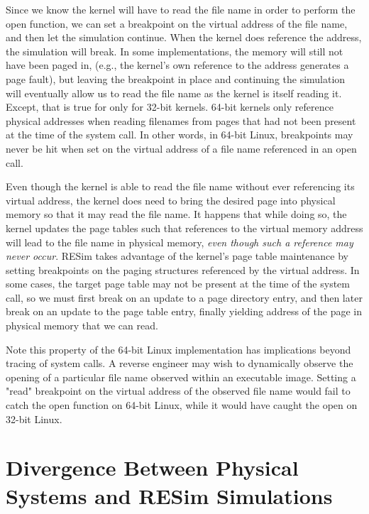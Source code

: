 \documentclass[titlepage]{article}
\begin{document}
\begin{appendices}
Since we know the kernel will have to read the file name in order to perform the open function, we
can set a breakpoint on the virtual address of the file name, and then let the simulation continue. 
When the kernel does reference the address, the simulation will break.  In some implementations, the
memory will still not have been paged in, (e.g., the kernel's own reference to the address generates a page fault),
but leaving the breakpoint in place and continuing the simulation
will eventually allow us to read the file name as the kernel is itself reading it.  Except, that is true for only 
for 32-bit kernels.  64-bit kernels only reference physical addresses when reading filenames from pages that had
not been present at the time of the system call.  In other words,
in 64-bit Linux, breakpoints may never be hit when set on the virtual address of a file name referenced in an open call.

Even though the kernel is able to read the file name without ever referencing its virtual address, the kernel does
need to bring the desired page into physical memory so that it may read the file name.  It happens that while doing so, the kernel
updates the page tables such that references to the virtual memory address will lead to the file name in
physical memory, \textit{even though such a reference may never occur}.  RESim takes advantage of the kernel's
page table maintenance by setting breakpoints on the paging structures referenced by the virtual address.
In some cases, the target page table may not be present at the time of the system call, so we must first
break on an update to a page directory entry, and then later break on an update to the page table entry,
finally yielding address of the page in physical memory that we can read.

Note this property of the 64-bit Linux implementation has implications beyond tracing of system calls.  A reverse
engineer may wish to dynamically observe the opening of a particular file name observed within an executable image.
Setting a "read" breakpoint on the virtual address of the observed file name would fail to catch the open function
on 64-bit Linux, while it would have caught the open on 32-bit Linux.

\section{Divergence Between Physical Systems and RESim Simulations}
\label{divergence}

\end{appendices}
\end{document}
